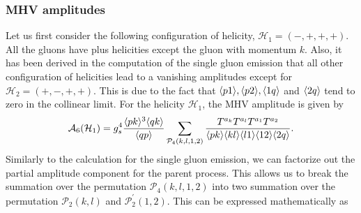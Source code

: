 \subsubsection{MHV amplitudes}
Let us first consider the following configuration of helicity, $\mathcal{H}_1=(-,+,+,+)$. All the gluons have plus helicities except the gluon with momentum $k$. Also, it has been derived in the computation of the single gluon emission that all other configuration of helicities lead to a vanishing amplitudes except for $\mathcal{H}_2=(+,-,+,+)$. This is due to the fact that $\langle p1\rangle,\langle p2\rangle,\langle1q\rangle$ and $\langle2q\rangle$ tend to zero in the collinear limit. For the helicity $\mathcal{H}_1$, the MHV amplitude is given by
\begin{equation}
\mathcal{A}_6(\mathcal{H}_1)=g^4_s \frac{\langle pk\rangle^3\langle qk\rangle}{\langle qp\rangle}\sum_{\mathcal{P}_4(k,l,1,2)} \frac{T^{a_k}T^{a_l}T^{a_1}T^{a_2}}{\langle pk\rangle\langle kl\rangle\langle l1\rangle\langle12\rangle\langle2q\rangle}.
\end{equation}
Similarly to the calculation for the single gluon emission, we can factorize out the partial amplitude component for the parent process. This allows us to break the summation over the permutation $\mathcal{P}_4(k,l,1,2)$ into two summation over the permutation $\mathcal{P}_2(k,l)$ and $\mathcal{P}^{'}_2(1,2)$. This can be expressed mathematically as 

